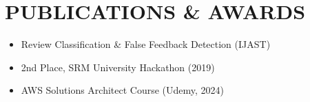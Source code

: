 \documentclass[letterpaper,10pt]{article}
\newcommand{\resumeItem}[1]{\item\small #1}
\begin{document}
\section{\textcolor{metablue}{PUBLICATIONS \& AWARDS}}
\vspace{-5pt}
\begin{itemize}
\resumeItem{Review Classification \& False Feedback Detection (IJAST)}
\resumeItem{2nd Place, SRM University Hackathon (2019)}
\resumeItem{AWS Solutions Architect Course (Udemy, 2024)}
\end{itemize}
\end{document}
